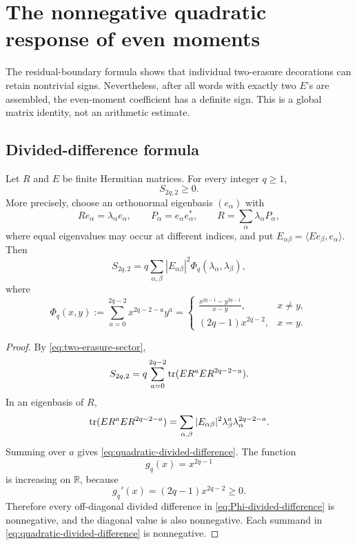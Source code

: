 \section{The nonnegative quadratic response of even moments}
\label{sec:quadratic-response}

The residual-boundary formula shows that individual two-erasure
decorations can retain nontrivial signs.  Nevertheless, after all words
with exactly two \(E\)'s are assembled, the even-moment coefficient has a
definite sign.  This is a global matrix identity, not an arithmetic
estimate.

\subsection{Divided-difference formula}

\begin{theorem}
\label{thm:quadratic-response}
Let \(R\) and \(E\) be finite Hermitian matrices.  For every integer
\(q\ge1\),
\begin{equation}
 \boxed{S_{2q,2}\ge0.}
 \label{eq:quadratic-response-positive}
\end{equation}
More precisely, choose an orthonormal eigenbasis
\((e_\alpha)\) with
\[
 Re_\alpha=\lambda_\alpha e_\alpha,
\qquad
 P_\alpha=e_\alpha e_\alpha^*,
\qquad
 R=\sum_\alpha\lambda_\alpha P_\alpha,
\]
where equal eigenvalues may occur at different indices, and put
\(E_{\alpha\beta}=\langle Ee_\beta,e_\alpha\rangle\).  Then
\begin{equation}
 \boxed{
 S_{2q,2}
 =
 q\sum_{\alpha,\beta}
 |E_{\alpha\beta}|^2
 \Phi_q(\lambda_\alpha,\lambda_\beta),}
 \label{eq:quadratic-divided-difference}
\end{equation}
where
\begin{equation}
 \Phi_q(x,y)
 :=
 \sum_{a=0}^{2q-2}x^{2q-2-a}y^a
 =
 \begin{cases}
 \displaystyle
 \frac{x^{2q-1}-y^{2q-1}}{x-y},&x\ne y,\\[8pt]
 (2q-1)x^{2q-2},&x=y.
 \end{cases}
 \label{eq:Phi-divided-difference}
\end{equation}
\end{theorem}

\begin{proof}
By \eqref{eq:two-erasure-sector},
\[
 S_{2q,2}
 =
 q\sum_{a=0}^{2q-2}
 \operatorname{tr}(E R^aE R^{2q-2-a}).
\]
In an eigenbasis of \(R\),
\[
 \operatorname{tr}(E R^aE R^{2q-2-a})
 =
 \sum_{\alpha,\beta}
 |E_{\alpha\beta}|^2
 \lambda_\beta^a
 \lambda_\alpha^{2q-2-a}.
\]
Summing over \(a\) gives
\eqref{eq:quadratic-divided-difference}.  The function
\[
 g_q(x)=x^{2q-1}
\]
is increasing on \(\mathbb R\), because
\[
 g_q'(x)=(2q-1)x^{2q-2}\ge0.
\]
Therefore every off-diagonal divided difference in
\eqref{eq:Phi-divided-difference} is nonnegative, and the diagonal value
is also nonnegative.  Each summand in
\eqref{eq:quadratic-divided-difference} is nonnegative.
\end{proof}


